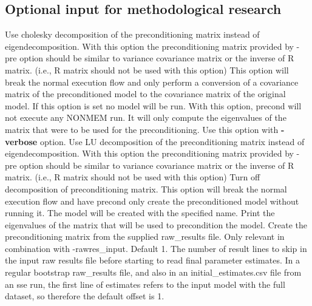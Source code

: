 \subsection{Optional input for methodological research}

\begin{optionlist}
Use cholesky decomposition of the preconditioning matrix instead of eigendecomposition.  With this option the preconditioning matrix provided by -pre option should be similar to variance covariance matrix or the inverse of R matrix.  (i.e., R matrix should not be used with this option)
\nextopt
{}
This option will break the normal execution flow and only perform a conversion of a covariance matrix of the preconditioned model to the covariance matrix of the original model.
If this option is set no model will be run.
\nextopt
{}
With this option, precond will not execute any NONMEM run.  It will only compute the eigenvalues of the matrix that were to be used for the preconditioning.  Use this option with {\bf-verbose} option.
\nextopt	
{}
Use LU decomposition of the preconditioning matrix instead of eigendecomposition.  With this option the preconditioning matrix provided by -pre option should be similar to variance covariance matrix or the inverse of R matrix.  (i.e., R matrix should not be used with this option)
\nextopt
{}
Turn off decomposition of preconditioning matrix.
\nextopt
{}
This option will break the normal execution flow and have precond only create the preconditioned model without running it.
The model will be created with the specified name.
\nextopt
{}
Print the eigenvalues of the matrix that will be used to precondition the model.
\nextopt
{}
Create the preconditioning matrix from the supplied raw\_results file.
\nextopt
{}
Only relevant in combination with -rawres\_input. Default 1. The number of result lines to skip in the input raw results file before starting to read final parameter estimates. In a regular bootstrap raw\_results file, and also in an initial\_estimates.csv file from an sse run, the first line of estimates refers to the input model with the full dataset, so therefore the default offset is 1.
\nextopt
{}

\end{optionlist}
